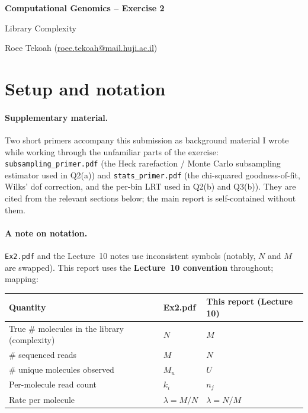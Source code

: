 \documentclass[11pt,a4paper]{article}
\begin{document}
\begin{center}
    {\Large\bfseries Computational Genomics -- Exercise 2}

    \vspace{0.4em}
    {\large Library Complexity}

    \vspace{0.7em}
    Roee Tekoah \quad
    (\href{mailto:roee.tekoah@mail.huji.ac.il}{roee.tekoah@mail.huji.ac.il})
\end{center}

\vspace{0.4em}

\setcounter{tocdepth}{2}
\begingroup
\renewcommand{\contentsname}{\normalsize Contents}
{\small\tableofcontents}
\endgroup

\vspace{0.4em}

\section{Setup and notation}

\paragraph{Supplementary material.}
Two short primers accompany this submission as background material I wrote
while working through the unfamiliar parts of the exercise:
\texttt{subsampling\_primer.pdf} (the Heck rarefaction / Monte Carlo
subsampling estimator used in Q2(a)) and \texttt{stats\_primer.pdf} (the
chi-squared goodness-of-fit, Wilks' dof correction, and the per-bin LRT
used in Q2(b) and Q3(b)). They are cited from the relevant sections below;
the main report is self-contained without them.

\paragraph{A note on notation.}
\texttt{Ex2.pdf} and the Lecture~10 notes use inconsistent symbols (notably, $N$
and $M$ are swapped). This report uses the \textbf{Lecture~10 convention}
throughout; mapping:

\begin{center}
\renewcommand{\arraystretch}{1.15}
\begin{tabular}{lll}
\textbf{Quantity} & \textbf{Ex2.pdf} & \textbf{This report (Lecture 10)} \\\hline
True \# molecules in the library (complexity)  & $N$              & $M$ \\
\# sequenced reads                              & $M$              & $N$ \\
\# unique molecules observed                    & $M_u$            & $U$ \\
Per-molecule read count                         & $k_i$            & $n_j$ \\
Rate per molecule                               & $\lambda = M/N$  & $\lambda = N/M$ \\
\end{tabular}
\end{center}
\end{document}
